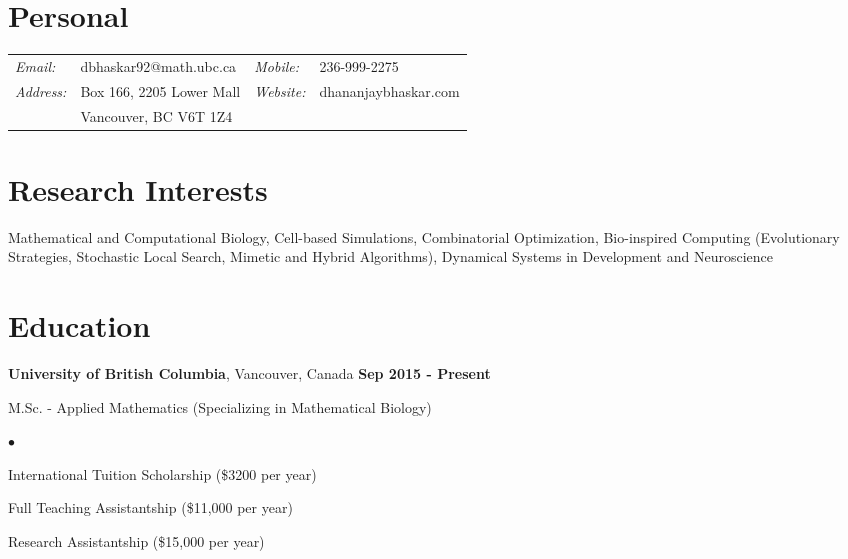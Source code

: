 \documentclass[margin,line]{res}
\newenvironment{list1}{
  \begin{list}{\ding{113}}{
      \setlength{\itemsep}{0in}
      \setlength{\parsep}{0in} \setlength{\parskip}{0in}
      \setlength{\topsep}{0in} \setlength{\partopsep}{0in} 
      \setlength{\leftmargin}{0.17in}}}{\end{list}}
\newenvironment{list2}{
  \begin{list}{$\bullet$}{
      \setlength{\itemsep}{0in}
      \setlength{\parsep}{0in} \setlength{\parskip}{0in}
      \setlength{\topsep}{0in} \setlength{\partopsep}{0in} 
      \setlength{\leftmargin}{0.2in}}}{\end{list}}
\begin{document}
\pagestyle{plain}
 

\begin{resume}

\vspace*{.2cm}

\section{\sc Personal}
\begin{tabular}{@{}p{1.4cm}p{6.7cm}p{2.1cm}p{4cm}}
{\it Email:}& dbhaskar92@math.ubc.ca &  {\it Mobile:}& 236-999-2275  \\
{\it Address:}& Box 166, 2205 Lower Mall & {\it Website:}& dhananjaybhaskar.com \\
& Vancouver, BC V6T 1Z4 & & \\
\end{tabular}

\vspace*{.2cm}

\section{\sc Research Interests}
Mathematical and Computational Biology, Cell-based Simulations, Combinatorial Optimization, Bio-inspired Computing (Evolutionary Strategies, Stochastic Local Search, Mimetic and Hybrid Algorithms), Dynamical Systems in Development and Neuroscience

\vspace*{.3cm}

\section{\sc Education}

{\bf University of British Columbia}, Vancouver, Canada  \hfill {\bf Sep 2015 - Present}\\
\vspace*{-.2cm}
\begin{list1}
\item[] M.Sc. - Applied Mathematics (Specializing in Mathematical Biology)
\begin{list2}
\vspace*{.1cm}
\item International Tuition Scholarship (\$3200 per year)
\item Full Teaching Assistantship (\$11,000 per year)
\item Research Assistantship (\$15,000 per year)
\end{list2}
\end{list1}
\vspace*{.1cm}
 

\end{resume}
\end{document}
